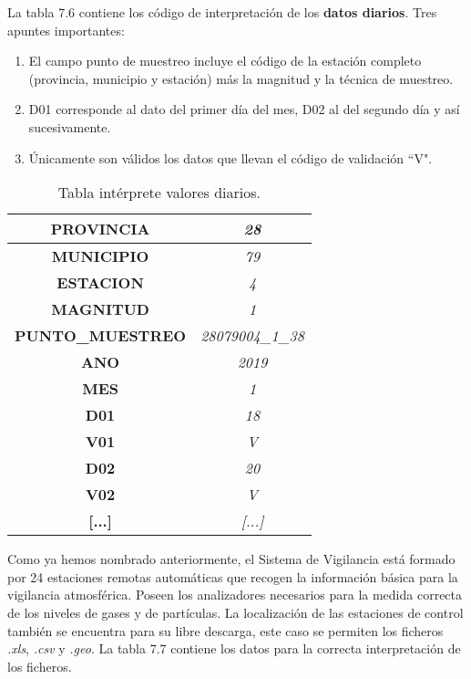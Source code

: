 La tabla 7.6 contiene los código de interpretación de los \textbf{datos diarios}. Tres apuntes importantes:

\begin{enumerate}
	\item El campo punto de muestreo incluye el código de la estación completo (provincia, municipio y estación) más la magnitud y la técnica de muestreo.
	
	\item D01 corresponde al dato del primer día del mes, D02 al del segundo día y así sucesivamente.
	
	\item Únicamente son válidos los datos que llevan el código de validación “V".
\end{enumerate}

\begin{table}[H]
	\begin{center}
		\begin{tabular}{|c|c|}
			\hline
			\textbf{PROVINCIA}       & \textit{28}              \\ \hline
			\textbf{MUNICIPIO}       & \textit{79}              \\ \hline
			\textbf{ESTACION}        & \textit{4}               \\ \hline
			\textbf{MAGNITUD}        & \textit{1}               \\ \hline
			\textbf{PUNTO\_MUESTREO} & \textit{28079004\_1\_38} \\ \hline
			\textbf{ANO}             & \textit{2019}            \\ \hline
			\textbf{MES}             & \textit{1}               \\ \hline
			\textbf{D01}             & \textit{18}              \\ \hline
			\textbf{V01}             & \textit{V}               \\ \hline
			\textbf{D02}             & \textit{20}              \\ \hline
			\textbf{V02}             & \textit{V}               \\ \hline
			\textbf{[...]}             & \textit{[...]}               \\ \hline
		\end{tabular}
	\caption{Tabla intérprete valores diarios.}
	\end{center}
\label{TablaValDiarios}
\end{table}


Como ya hemos nombrado anteriormente, el Sistema de Vigilancia está formado por 24 estaciones remotas automáticas que recogen la información básica para la vigilancia atmosférica. Poseen los analizadores necesarios para la medida correcta de los niveles de gases y de partículas. La localización de las estaciones de control también se encuentra para su libre descarga, este caso se permiten los ficheros \textit{.xls}, \textit{.csv} y \textit{.geo}. La tabla 7.7 contiene los datos para la correcta interpretación de los ficheros.

